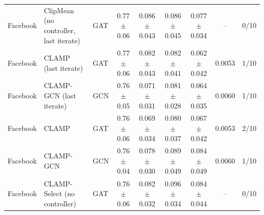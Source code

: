 \begin{longtable}{lp{2.2cm}lcccccc}
Facebook & ClipMean (no controller, last iterate) & GAT & 0.77$\pm$0.06 & 0.086$\pm$0.043 & 0.086$\pm$0.045 & 0.077$\pm$0.034 & -- & 0/10 \\
Facebook & CLAMP (last iterate) & GAT & 0.77$\pm$0.06 & 0.082$\pm$0.043 & 0.082$\pm$0.041 & 0.062$\pm$0.042 & 0.0053 & 1/10 \\
Facebook & CLAMP-GCN (last iterate) & GCN & 0.76$\pm$0.05 & 0.071$\pm$0.031 & 0.081$\pm$0.028 & 0.064$\pm$0.035 & 0.0060 & 1/10 \\
Facebook & CLAMP & GAT & 0.76$\pm$0.06 & 0.069$\pm$0.034 & 0.080$\pm$0.037 & 0.067$\pm$0.042 & 0.0053 & 2/10 \\
Facebook & CLAMP-GCN & GCN & 0.76$\pm$0.04 & 0.078$\pm$0.030 & 0.089$\pm$0.049 & 0.084$\pm$0.049 & 0.0060 & 1/10 \\
Facebook & CLAMP-Select (no controller) & GAT & 0.76$\pm$0.06 & 0.082$\pm$0.032 & 0.096$\pm$0.034 & 0.084$\pm$0.044 & -- & 0/10 \\
\end{longtable}
